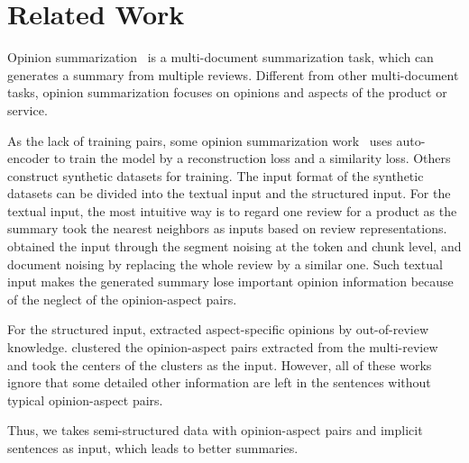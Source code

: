 \section{Related Work}
\label{sec:related}

Opinion summarization~\cite{GeraniMCNN14} is a multi-document summarization task,
which can generates
a summary from multiple reviews. 
Different from other multi-document tasks, opinion summarization focuses on opinions and aspects of the product or service.

As the lack of training pairs,
some opinion summarization work~\cite{MeanSum19} uses auto-encoder to train the model 
by a reconstruction loss and a similarity loss. 
Others construct synthetic datasets for training. 
The input format of the synthetic datasets can be divided into the textual input and the structured input.
For the textual input,
the most intuitive way 
\citet{Copycat20, Fewshot20} is to 
regard one review for a product as the summary 
\citet{Plansum20} took the nearest neighbors as inputs based on review representations.
\citet{Denoise20} obtained the input through the segment noising at the token and chunk level, and document noising by replacing the whole review by a similar one. Such textual input makes the generated summary lose important
opinion information because of the neglect of the opinion-aspect pairs.

For the structured input, 
 \citet{AngelidisL18} extracted aspect-specific opinions by out-of-review knowledge. 
\citet{OpiDig20} clustered the opinion-aspect pairs extracted from the multi-review and took the centers of the clusters as the input. 
However, all of these works ignore that some detailed other information are left in the sentences without typical opinion-aspect pairs. 

Thus, we takes semi-structured data with
opinion-aspect pairs and implicit sentences as input,
which leads to better summaries.  
